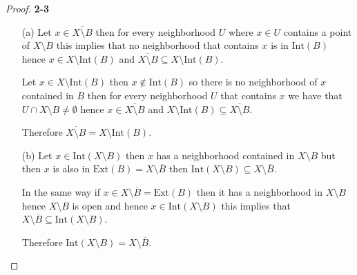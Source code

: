 \documentclass[11pt]{article}
\newcommand{\inter}{\text{Int}}
\newcommand{\ext}{\text{Ext}}
\newcommand{\setmin}{\setminus}
\theoremstyle{definition}
\begin{document}
\cleardoublepage
\begin{proof}{\textbf{2-3}}
    \begin{itemize}
    \item [(a)]
    Let $x \in \overline{X \setmin B}$ then for every neighborhood $U$ where
    $x \in U$ contains a point of $X \setmin B$ this implies that no
    neighborhood that contains $x$ is in $\inter(B)$ hence 
    $x \in X \setmin \inter(B)$ and
    $\overline{X \setmin B} \subseteq X \setmin \inter(B)$.

    Let $x \in X \setmin \inter(B)$ then $x \not\in \inter(B)$ so there is no 
    neighborhood of $x$ contained in $B$ then for every neighborhood $U$ that
    contains $x$ we have that $U \cap X \setmin B \neq \emptyset$ hence
    $x \in \overline{X \setmin B}$ and
    $X \setmin \inter(B) \subseteq \overline{X \setmin B}$.

    Therefore $\overline{X \setmin B} = X \setmin \inter(B)$.

    \item [(b)]
    Let $ x \in \inter(X \setmin B)$ then $x$ has a neighborhood contained in
    $X \setmin B$ but then $x$ is also in $\ext(B) = X \setmin \overline{B}$
    then $\inter(X \setmin B) \subseteq X \setmin \overline{B}$.

    In the same way if $x \in X \setmin \overline{B} = \ext(B)$ then it has a
    neighborhood in $X \setmin B$ hence $X \setmin B$ is open and hence
    $x \in \inter(X \setmin B)$ this implies that
    $ X \setmin \overline{B} \subseteq \inter(X \setmin B)$.
    
    Therefore $\inter(X \setmin B) = X \setmin \overline{B}$.
    \end{itemize}
\end{proof}
\cleardoublepage
\end{document}
